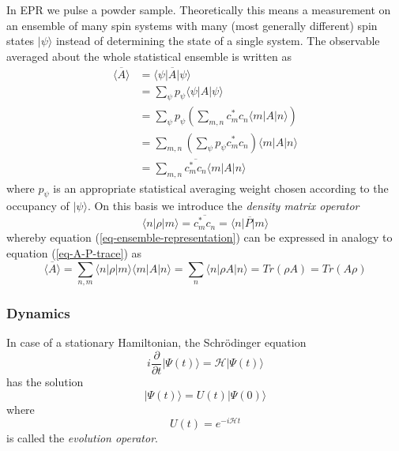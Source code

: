 \documentclass[11.5pt,a4paper]{article}
\begin{document}
In EPR we pulse a powder sample. Theoretically this means a measurement on an ensemble of many spin systems with many (most generally different) spin states $|\psi\rangle$ instead of determining the state of a single system. The observable averaged about the whole statistical ensemble is written as
\begin{align}
 \overline{\langle A \rangle} & = \overline{\langle \psi | A | \psi \rangle} \\
  & = \sum_\psi p_\psi \langle \psi | A | \psi \rangle \\ 
  & = \sum_\psi p_\psi \left( \sum_{m,n} c_m^* c_n \langle m | A | n \rangle \right) \\
  & = \sum_{m,n} \left( \sum_\psi p_\psi c_m^* c_n \right) \langle m | A | n \rangle \\
  & = \sum_{m,n} \overline{c_m^* c_n} \langle m | A | n \rangle
  \label{eq-ensemble-representation}
\end{align}
where $p_\psi$ is an appropriate statistical averaging weight chosen according to the occupancy of $|\psi\rangle$. On this basis we introduce the \emph{density matrix operator}
\begin{equation} 
 \langle n | \rho | m \rangle = \overline{c_m^* c_n} = \overline{\langle n | P | m \rangle}
\end{equation}
whereby equation (\ref{eq-ensemble-representation}) can be expressed in analogy to equation (\ref{eq-A-P-trace}) as
\begin{equation}
 \overline{\langle A \rangle} = \sum_{n,m} \langle n | \rho | m \rangle \langle m | A | n \rangle = \sum_{n} \langle n | \rho A | n \rangle = Tr(\rho A) = Tr(A \rho)
\end{equation}

 






\subsubsection{Dynamics}
In case of a stationary Hamiltonian, the Schr\"odinger equation 
\begin{equation}
  i \frac{\partial}{\partial t} | \Psi(t) \rangle = \mathcal{H} |\Psi(t) \rangle
\end{equation}
has the solution
\begin{equation}
  |\Psi(t)\rangle = U(t) | \Psi(0) \rangle
\end{equation}
where 
\begin{equation}
 U(t) = e^{-i \mathcal{H} t}
\end{equation}
is called the \emph{evolution operator}.
\end{document}
